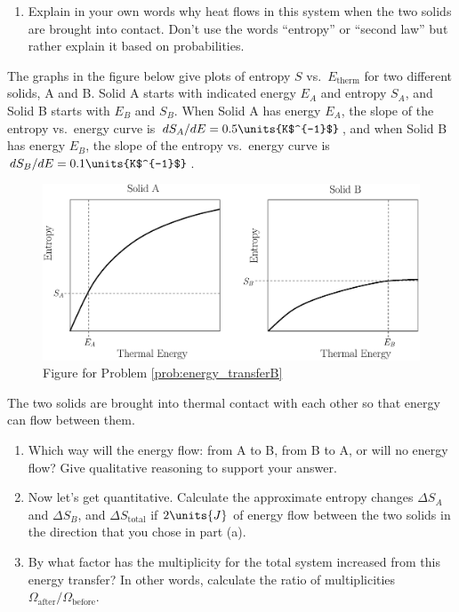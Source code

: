 \begin{problem}
\begin{enumerate}
\item Explain in your own words why heat flows in this system when the
two solids are brought into contact.  Don't use the words ``entropy''
or ``second law'' but rather explain it based on probabilities.

\end{enumerate}
\label{prob:energy_transferA}
\end{problem}

\begin{problem}
The graphs in the figure below give plots of entropy $S$ vs.\
$E_\text{therm}$ for two different solids, A and B.  Solid A starts with
indicated energy $E_A$ and entropy $S_A$, and Solid B starts with $E_B$
and $S_B$.  When Solid A has energy $E_A$, the slope of the entropy vs.\
energy curve is $dS_A/dE= 0.5\units{K$^{-1}$}$, and when Solid B has
energy $E_B$, the slope of the entropy vs.\ energy curve is $dS_B/dE =
0.1\units{K$^{-1}$}$.

\begin{figure}[h]
\begin{center}
\includegraphics[width=5.0in]{second_law_and_entropy/energy_transferB.eps}
\caption{Figure for Problem \ref{prob:energy_transferB}}
\label{fig:energy_transferB}
\end{center}
\end{figure}

The two solids are brought into thermal contact with each other so that
energy can flow between them.
\begin{enumerate}
\item Which way will the energy flow:  from A to B, from B to A, or 
will no energy flow?  Give  qualitative reasoning to support your answer.
\item Now let's get quantitative.  Calculate the approximate  
entropy changes $\Delta S_A$ and $\Delta S_B$, and $\Delta S_\text{total}$ 
if $2\units{J}$ of energy flow between the two solids in the direction 
that you chose in part (a).  
\item By what factor has the multiplicity for the total system increased
from this energy transfer?  In other words, calculate the ratio of 
multiplicities $\Omega_\text{after}/\Omega_\text{before}$.


\end{enumerate}
\end{problem}
